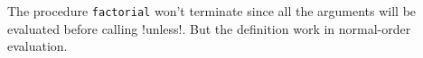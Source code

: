 \documentclass[a4paper,12pt]{article}
\begin{document}
The procedure \lstinline!factorial! won't terminate since all the
arguments will be evaluated before calling \lstlinline!unless!.  But
the definition work in normal-order evaluation.
\end{document}
